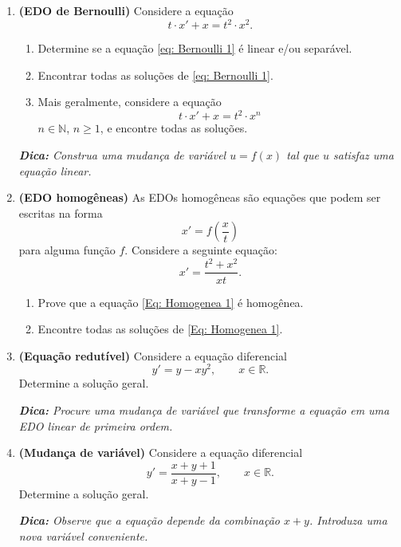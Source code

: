 \documentclass[a4paper,
11pt,  reqno]{amsart}
\begin{document}
\begin{enumerate}
\medskip

\item \textbf{(EDO de Bernoulli)} Considere a equação
\begin{equation}\label{eq: Bernoulli 1}
    t\cdot x' + x = t^2\cdot x^2.
\end{equation}
\begin{enumerate}
    \item Determine se a equação \eqref{eq: Bernoulli 1} é linear e/ou separável. 
    \item Encontrar todas as soluções de \eqref{eq: Bernoulli 1}. 
    \item Mais geralmente, considere a equação 
    \begin{equation*}
        t\cdot x' + x = t^2 \cdot x^n
    \end{equation*}
    $n\in\mathbb{N}$, $n\geq1$, e encontre todas as soluções.
\end{enumerate}

\medskip

\textit{ \textbf{ Dica:} Construa uma mudança de variável $u = f(x)$ tal que $u$ satisfaz uma equação linear.}

\medskip

\item \textbf{(EDO homogêneas)} As EDOs homogêneas são equações que podem ser escritas na forma
\begin{equation*}
    x' = f\left(\frac{x}{t}\right)
\end{equation*}
para alguma função $f$. Considere a seguinte equação:
\begin{equation}\label{Eq: Homogenea 1}
    x' = \frac{t^2+x^2}{xt}.
\end{equation}
\begin{enumerate}
    \item Prove que a equação \eqref{Eq: Homogenea 1} é homogênea. 
    \item Encontre todas as soluções de \eqref{Eq: Homogenea 1}.
\end{enumerate}

\medskip

\item {\bf (Equação redutível)} Considere a equação diferencial
\[
y' = y - x y^2, \qquad x \in \mathbb{R}.
\]
Determine a solução geral.

\medskip

\textit{\textbf{ Dica:} Procure uma mudança de variável que transforme a equação em uma EDO linear de primeira ordem.}

\medskip

\item {\bf (Mudança de variável)} Considere a equação diferencial
\[
y' = \frac{x + y + 1}{x + y - 1}, \qquad x \in \mathbb{R}.
\]
Determine a solução geral.

\medskip

\textit{\textbf{ Dica:} Observe que a equação depende da combinação \(x+y\). Introduza uma nova variável conveniente.} 


\end{enumerate}

\clearpage
\end{document}
